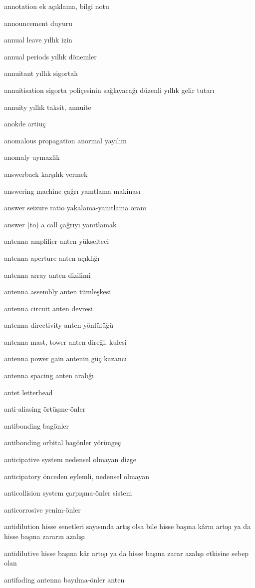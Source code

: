 \documentclass[12pt,fleqn]{article}\usepackage{../../common}
\begin{document}
annotation ek açıklama, bilgi notu

announcement duyuru

annual leave yıllık izin

annual periods yıllık dönemler

annuitant yıllık sigortalı

annuitisation sigorta poliçesinin sağlayacağı düzenli yıllık gelir tutarı

annuity yıllık taksit, annuite

anokde artiuç

anomalous propagation anormal yayılım

anomaly uymazlik

answerback karşılık vermek

answering machine çağrı yanıtlama makinası

answer seizure ratio yakalama-yanıtlama oranı

answer (to) a call çağrıyı yanıtlamak

antenna amplifier anten yükselteci

antenna aperture anten açıklığı

antenna array anten dizilimi

antenna assembly anten tümleşkesi

antenna circuit anten devresi

antenna directivity anten yönlülüğü

antenna mast, tower anten direği, kulesi

antenna power gain antenin güç kazancı

antenna spacing anten aralığı

antet letterhead

anti-aliasing örtüşme-önler

antibonding bagönler

antibonding orbital bagönler yörüngeç

anticipative system nedensel olmayan dizge

anticipatory önceden eylemli, nedensel olmayan

anticollision system çarpışma-önler sistem

anticorrosive yenim-önler

antidilution hisse senetleri sayısında artış olsa bile hisse başına kârın artışı ya da hisse başına zararın azalışı

antidilutive hisse başına kâr artışı ya da hisse başına zarar azalışı etkisine sebep olan

antifading antenna bayılma-önler anten
\end{document}

